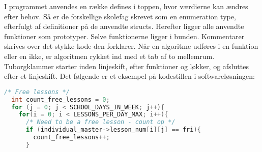 I programmet anvendes en række defines i toppen, hvor værdierne kan ændres efter behov. Så er de forskellige skolefag skrevet som en enumeration type, efterfulgt af definitioner på de anvendte structs. Herefter ligger alle anvendte funktioner som prototyper. Selve funktionerne ligger i bunden. Kommentarer skrives over det stykke kode den forklarer. Når en algoritme udføres i en funktion eller en ikke, er algoritmen rykket ind med et tab af to mellemrum. Tuborgklammer starter inden linjeskift, efter funktioner og løkker, og afsluttes efter et linjeskift. Det følgende er et eksempel på kodestillen i softwareløsningen: 
\begin{lstlisting}[language=c]
/* Free lessons */
  int count_free_lessons = 0;
  for (j = 0; j < SCHOOL_DAYS_IN_WEEK; j++){
    for(i = 0; i < LESSONS_PER_DAY_MAX; i++){
      /* Need to be a free lesson - count op */
      if (individual_master->lesson_num[i][j] == fri){
        count_free_lessons++;
      }
\end{lstlisting}
